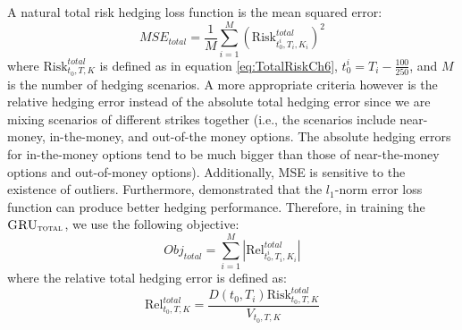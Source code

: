 \documentclass[letterpaper,12pt,titlepage,oneside,final]{book}
\numberwithin{equation}{section}
\theoremstyle{definition}
\newcommand{\model}{\textsc{GRU}_\delta}
\newcommand{\modelT}{\textsc{GRU}_{\textsc{total}}}
\newcommand{\modelL}{\textsc{GRU}_{\textsc{total}}^{\textsc{local}}}
\newcommand{\DS}{\Delta S}
\newcommand{\DT}{\Delta t}
\newcommand{\Smkt}{S}
\begin{document}
A natural total risk hedging loss function is the mean squared error:
\[
MSE_{total}=\frac{1}{M} \sum_{i=1}^M  \left(\text{Risk}^{total}_{t_0^i,T_i,K_i}\right)^2
\]
where $\text{Risk}^{total}_{t_0,T,K}$ is defined as in equation \eqref{eq:TotalRiskCh6},  $t_0^i=T_i-\frac{100}{250}$, and $M$ is the number of hedging scenarios.
A more appropriate criteria however is the relative hedging error instead of the absolute total hedging error since we are mixing scenarios of different strikes together (i.e., the scenarios include near-money, in-the-money, and out-of-the money options. The absolute hedging errors for in-the-money options tend to be much bigger than those of  near-the-money options and out-of-money options). Additionally, MSE is sensitive to the existence of outliers. Furthermore, \citet{coleman2007total} demonstrated that the  $l_1$-norm error loss function can produce better hedging performance. 
Therefore, in training the $\modelT$, we use the following objective:
\begin{equation}
Obj_{total}=\sum_{i=1}^M \left|\text{Rel}^{total}_{t_0^{i},T_i,K_i}\right|
\label{eq:totalObjLinear}
\end{equation}
where the relative total hedging error is defined as:
\begin{equation}
\text{Rel}^{total}_{t_0,T,K}
=\frac{D(t_0,T_i)  \text{Risk}^{total}_{t_0,T,K}}{V_{t_0,T,K}}
\label{eq:relHError}
\end{equation}


%
%
\end{document}
